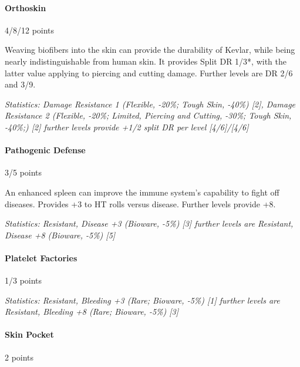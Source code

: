 \begin{multicols*}{3}
	\paragraph{Orthoskin}
	\begin{flushright}
		4/8/12 points
	\end{flushright}
	
	Weaving biofibers into the skin can provide the durability of Kevlar, while being nearly indistinguishable from human skin. It provides Split DR 1/3*, with the latter value applying to piercing and cutting damage. Further levels are DR 2/6 and 3/9.
	
	\textit{\textcolor{OliveGreen}{Statistics: Damage Resistance 1 (Flexible, -20\%; Tough Skin, -40\%) [2], Damage Resistance 2 (Flexible, -20\%; Limited, Piercing and Cutting, -30\%; Tough Skin, -40\%;) [2] further levels provide +1/2 split DR per level [4/6]/[4/6]}}
	
	\paragraph{Pathogenic Defense}
	\begin{flushright}
		3/5 points
	\end{flushright}
	
	An enhanced spleen can improve the immune system's capability to fight off diseases. Provides +3 to HT rolls versus disease.  Further levels provide +8.
	
	\textit{\textcolor{OliveGreen}{Statistics: Resistant, Disease +3 (Bioware, -5\%) [3] further levels are Resistant, Disease +8 (Bioware, -5\%) [5]}}
	
	\paragraph{Platelet Factories}
	\begin{flushright}
		1/3 points
	\end{flushright}
	
	\textit{\textcolor{OliveGreen}{Statistics: Resistant, Bleeding +3 (Rare; Bioware, -5\%) [1] further levels are Resistant, Bleeding +8 (Rare; Bioware, -5\%) [3]}}
	
	\paragraph{Skin Pocket}\label{skin_pocket}
	\begin{flushright}
		2 points
	\end{flushright}
	

\end{multicols*}
